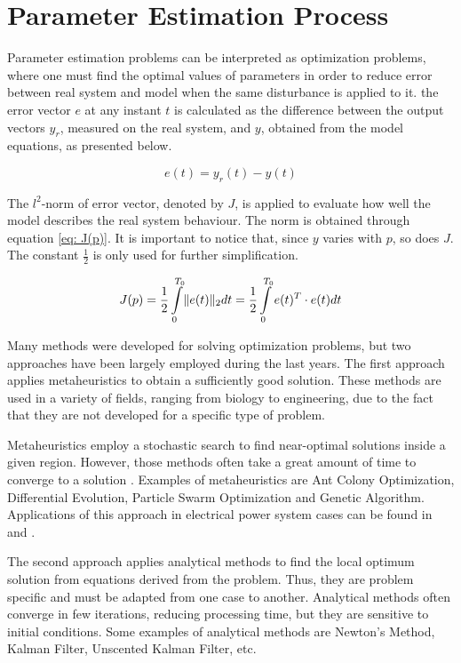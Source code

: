 \chapter{Parameter Estimation Process}
\label{ch: Estimation}

Parameter estimation problems can be interpreted as optimization problems, where one must find the optimal values of parameters in order to reduce error between real system and model when the same disturbance is applied to it. the error vector $e$ at any instant $t$ is calculated as the difference between the output vectors $y_{r}$, measured on the real system, and $y$, obtained from the model equations, as presented below.

\begin{equation}
	e(t) = y_{r}(t) - y(t)
	\label{eq: error_vector}
\end{equation}

The $l^{2}$-norm of error vector, denoted by $J$, is applied to evaluate how well the model describes the real system behaviour. The norm is obtained through equation \eqref{eq: J(p)}. It is important to notice that, since $y$ varies with $p$, so does $J$. The constant $\frac{1}{2}$ is only used for further simplification.

\begin{equation}
	J(p) = \frac{1}{2} \int\displaylimits_{0}^{T_{0}}\lVert e(t)\rVert_{2}dt = \frac{1}{2}\int\displaylimits_{0}^{T_{0}}e(t)^{T}\cdot e(t)dt
	\label{eq: J(p)}
\end{equation}

Many methods were developed for solving optimization problems, but two approaches have been largely employed during the last years. The first approach applies metaheuristics to obtain a sufficiently good solution. These methods are used in a variety of fields, ranging from biology to engineering, due to the fact that they are not developed for a specific type of problem.

Metaheuristics employ a stochastic search to find near-optimal solutions inside a given region. However, those methods often take a great amount of time to converge to a solution \cite{Blum2003}. Examples of metaheuristics are Ant Colony Optimization, Differential Evolution, Particle Swarm Optimization and Genetic Algorithm. Applications of this approach in electrical power system cases can be found in \cite{Todorovski2006} and \cite{Yoshida2000}.

The second approach applies analytical methods to find the local optimum solution from equations derived from the problem. Thus, they are problem specific and must be adapted from one case to another. Analytical methods often converge in few iterations, reducing processing time, but they are sensitive to initial conditions. Some examples of analytical methods are Newton's Method, Kalman Filter, Unscented Kalman Filter, etc.

